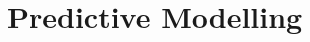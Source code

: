 \documentclass[a4paper, oneside, notitlepage]{book}
\begin{document}
%
%
%
%
%
%
%
%


\chapter{Predictive Modelling}
\end{document}
